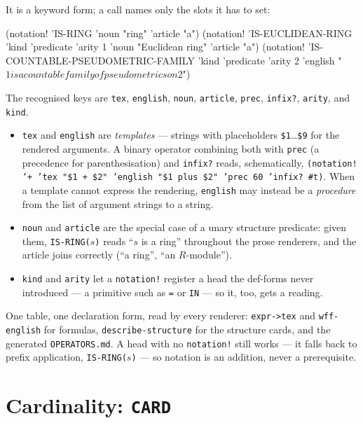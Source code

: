 It is a keyword form; a call names only the slots it has to set:
\begin{VNBcode}
(notation! 'IS-RING 'noun "ring" 'article "a")
(notation! 'IS-EUCLIDEAN-RING 'kind 'predicate 'arity 1
           'noun "Euclidean ring" 'article "a")
(notation! 'IS-COUNTABLE-PSEUDOMETRIC-FAMILY 'kind 'predicate 'arity 2
           'english "$1 is a countable family of pseudometrics on $2")
\end{VNBcode}

The recognised keys are
\texttt{tex}, \texttt{english}, \texttt{noun}, \texttt{article},
\texttt{prec}, \texttt{infix?}, \texttt{arity}, and \texttt{kind}.

\begin{itemize}
\item \texttt{tex} and \texttt{english} are \emph{templates} --- strings with
  placeholders \texttt{\$1}\ldots\texttt{\$9} for the rendered arguments.  A
  binary operator combining both with \texttt{prec} (a precedence for
  parenthesisation) and \texttt{infix?} reads, schematically,
  \texttt{(notation! '+ 'tex "\$1 + \$2" 'english "\$1 plus \$2" 'prec 60 'infix?
  \#t)}.  When a template cannot express the rendering, \texttt{english} may
  instead be a \emph{procedure} from the list of argument strings to a string.
\item \texttt{noun} and \texttt{article} are the special case of a unary
  structure predicate: given them, \texttt{IS-RING($s$)} reads ``$s$ is a
  ring'' throughout the prose renderers, and the article joins correctly
  (``a ring'', ``an $R$-module'').
\item \texttt{kind} and \texttt{arity} let a \texttt{notation!} register a head
  the def-forms never introduced --- a primitive such as \texttt{=} or
  \texttt{IN} --- so it, too, gets a reading.
\end{itemize}

One table, one declaration form, read by every renderer: \texttt{expr->tex} and
\texttt{wff-english} for formulas, \texttt{describe-structure} for the structure
cards, and the generated \texttt{OPERATORS.md}.  A head with no
\texttt{notation!} still works --- it falls back to prefix application,
\texttt{IS-RING($s$)} --- so notation is an addition, never a prerequisite.

\section{Cardinality: \texttt{CARD}}
\label{sec:cardinality}

